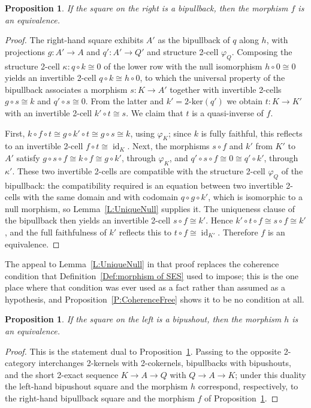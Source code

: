 \documentclass[reqno,a4paper]{amsart}
\numberwithin{equation}{section}
\theoremstyle{plain}
\newtheorem{proposition}[subsection]{Proposition}
\theoremstyle{definition}
\def\nameit#1{\textrm{#1}~}
\def\prox{\nameit{Proposition}}
\def\lemx{\nameit{Lemma}}
\def\defx{\nameit{Definition}}
\newcommand{\comp}{\circ}
\newcommand{\iso}{\cong}
\def\phi{\varphi}
\renewcommand{\1}{\onecat{1}}
\newcommand{\twoker}{\ensuremath{2\text{-}\mathrm{ker}}}
\newcommand{\id}[1]{\operatorname{id}_{#1}}
\begin{document}
\begin{proposition}\label{Right Square Pullback}
	If the square on the right is a bipullback, then the morphism \(f\) is an equivalence.
\end{proposition}
\begin{proof}
	The right-hand square exhibits \(A'\) as the bipullback of \(q\) along \(h\), with projections \(g\colon A'\to A\) and \(q'\colon A'\to Q'\) and structure 2-cell \(\phi_Q\). Composing the structure 2-cell \(\kappa\colon q\comp k\iso 0\) of the lower row with the null isomorphism \(h\comp 0\iso 0\) yields an invertible 2-cell \(q\comp k\iso h\comp 0\), to which the universal property of the bipullback associates a morphism \(s\colon K\to A'\) together with invertible 2-cells \(g\comp s\iso k\) and \(q'\comp s\iso 0\). From the latter and \(k'=\twoker(q')\) we obtain \(t\colon K\to K'\) with an invertible 2-cell \(k'\comp t\iso s\). We claim that \(t\) is a quasi-inverse of \(f\).

	First, \(k\comp f\comp t\iso g\comp k'\comp t\iso g\comp s\iso k\), using \(\phi_K\); since \(k\) is fully faithful, this reflects to an invertible 2-cell \(f\comp t\iso\id{K}\). Next, the morphisms \(s\comp f\) and \(k'\) from \(K'\) to \(A'\) satisfy \(g\comp s\comp f\iso k\comp f\iso g\comp k'\), through \(\phi_K\), and \(q'\comp s\comp f\iso 0\iso q'\comp k'\), through \(\kappa'\). These two invertible 2-cells are compatible with the structure 2-cell \(\phi_Q\) of the bipullback: the compatibility required is an equation between two invertible 2-cells with the same domain and with codomain \(q\comp g\comp k'\), which is isomorphic to a null morphism, so \lemx\ref{L:UniqueNull} supplies it. The uniqueness clause of the bipullback then yields an invertible 2-cell \(s\comp f\iso k'\). Hence \(k'\comp t\comp f\iso s\comp f\iso k'\), and the full faithfulness of \(k'\) reflects this to \(t\comp f\iso\id{K'}\). Therefore \(f\) is an equivalence.
\end{proof}

The appeal to \lemx\ref{L:UniqueNull} in that proof replaces the coherence condition that \defx\ref{Def:morphism of SES} used to impose; this is the one place where that condition was ever used as a fact rather than assumed as a hypothesis, and \prox\ref{P:CoherenceFree} shows it to be no condition at all.

\begin{proposition}\label{Left Square Pushout}
	If the square on the left is a bipushout, then the morphism \(h\) is an equivalence.
\end{proposition}
\begin{proof}
	This is the statement dual to \prox\ref{Right Square Pullback}. Passing to the opposite 2-category interchanges 2-kernels with 2-cokernels, bipullbacks with bipushouts, and the short 2-exact sequence \(K\to A\to Q\) with \(Q\to A\to K\); under this duality the left-hand bipushout square and the morphism \(h\) correspond, respectively, to the right-hand bipullback square and the morphism \(f\) of \prox\ref{Right Square Pullback}.
\end{proof}
\end{document}
